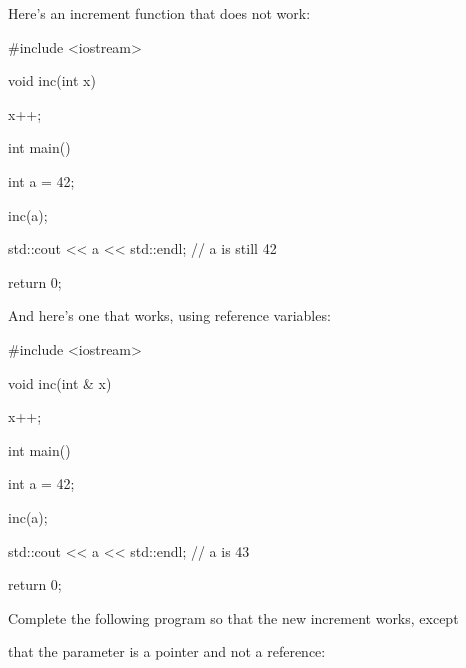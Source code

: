 
Here's an increment function that does not work:



\begin{consolethree}[escapeinside=||]

#include <iostream>



void inc(int x)

{

    x++;

}



int main()

{

    int a = 42;

    inc(a);

    std::cout << a << std::endl;    // a is still 42

    return 0;

}

\end{consolethree}

And here's one that works, using reference variables:



\begin{consolethree}[escapeinside=||]

#include <iostream>



void inc(int & x)

{

    x++;

}



int main()

{

    int a = 42;

    inc(a);

    std::cout << a << std::endl;    // a is 43

    return 0;

}

\end{consolethree}

Complete the following program so that the new increment works, except

that the parameter is a pointer and not a reference:

